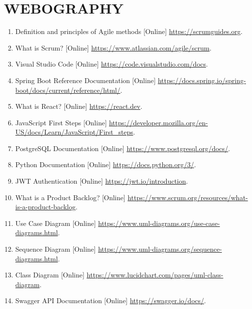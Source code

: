﻿\chapter*{WEBOGRAPHY}
\thispagestyle{MyStyle}

\begin{enumerate}
	\item Definition and principles of Agile methods [Online] \url{https://scrumguides.org}.

	\item What is Scrum? [Online] \url{https://www.atlassian.com/agile/scrum}.

	\item Visual Studio Code [Online] \url{https://code.visualstudio.com/docs}.

	\item Spring Boot Reference Documentation [Online] \url{https://docs.spring.io/spring-boot/docs/current/reference/html/}.

	\item What is React? [Online] \url{https://react.dev}.

	\item JavaScript First Steps [Online] \url{https://developer.mozilla.org/en-US/docs/Learn/JavaScript/First_steps}.

	\item PostgreSQL Documentation [Online] \url{https://www.postgresql.org/docs/}.

	\item Python Documentation [Online] \url{https://docs.python.org/3/}.

	\item JWT Authentication [Online] \url{https://jwt.io/introduction}.

	\item What is a Product Backlog? [Online] \url{https://www.scrum.org/resources/what-is-a-product-backlog}.

	\item Use Case Diagram [Online] \url{https://www.uml-diagrams.org/use-case-diagrams.html}.

	\item Sequence Diagram [Online] \url{https://www.uml-diagrams.org/sequence-diagrams.html}.

	\item Class Diagram [Online] \url{https://www.lucidchart.com/pages/uml-class-diagram}.

	\item Swagger API Documentation [Online] \url{https://swagger.io/docs/}.
\end{enumerate}

